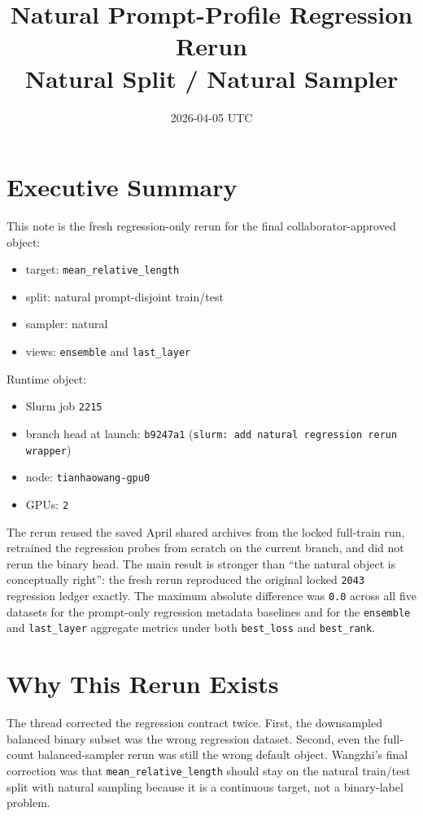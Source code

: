 \documentclass[11pt]{article}
\title{Natural Prompt-Profile Regression Rerun\\Natural Split / Natural Sampler}
\author{}
\date{2026-04-05 UTC}
\begin{document}
\maketitle

\section{Executive Summary}

This note is the fresh regression-only rerun for the final collaborator-approved
object:
\begin{itemize}
\item target: \texttt{mean\_relative\_length}
\item split: natural prompt-disjoint train/test
\item sampler: natural
\item views: \texttt{ensemble} and \texttt{last\_layer}
\end{itemize}

Runtime object:
\begin{itemize}
\item Slurm job \texttt{2215}
\item branch head at launch: \texttt{b9247a1} (\texttt{slurm: add natural regression rerun wrapper})
\item node: \texttt{tianhaowang-gpu0}
\item GPUs: \texttt{2}
\end{itemize}

The rerun reused the saved April shared archives from the locked full-train run,
retrained the regression probes from scratch on the current branch, and did not
rerun the binary head. The main result is stronger than ``the natural object is
conceptually right'': the fresh rerun reproduced the original locked
\texttt{2043} regression ledger exactly. The maximum absolute difference was
\texttt{0.0} across all five datasets for the prompt-only regression metadata
baselines and for the \texttt{ensemble} and \texttt{last\_layer} aggregate
metrics under both \texttt{best\_loss} and \texttt{best\_rank}.

\section{Why This Rerun Exists}

The thread corrected the regression contract twice. First, the downsampled
balanced binary subset was the wrong regression dataset. Second, even the
full-count balanced-sampler rerun was still the wrong default object. Wangzhi's
final correction was that \texttt{mean\_relative\_length} should stay on the
natural train/test split with natural sampling because it is a continuous
target, not a binary-label problem.
\end{document}
